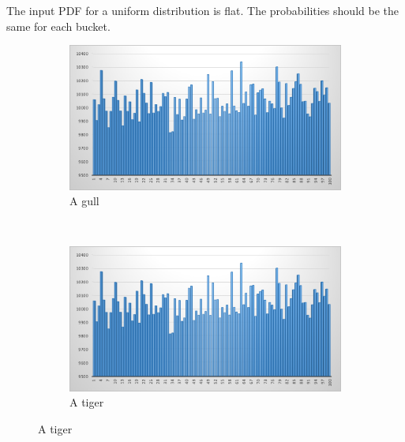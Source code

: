\documentclass[12pt,a4paper,article]{memoir} %
\begin{document}
The input PDF for a uniform distribution is flat. The probabilities
should be the same for each bucket. 


\begin{figure}[h!]
    \centering
    \begin{subfigure}[b]{0.45\textwidth}
        \includegraphics[width=\textwidth]{img/uni-m-1.png}
        \caption{A gull}
        \label{fig:gull}
    \end{subfigure}
    ~ %
    \begin{subfigure}[b]{0.45\textwidth}
        \includegraphics[width=\textwidth]{img/uni-m-1.png}
        \caption{A tiger}
        \label{fig:tiger}
    \end{subfigure}


\end{figure}
\end{document}
